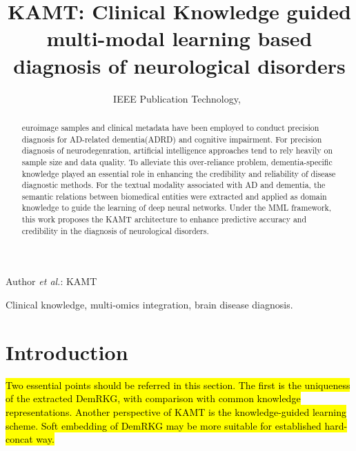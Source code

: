 \documentclass[lettersize,journal]{IEEEtran}
\begin{document}
\title{KAMT: Clinical Knowledge guided multi-modal learning based diagnosis of neurological disorders}


\author{IEEE Publication Technology,~
        
}

%
{Author \MakeLowercase{\textit{et al.}}: KAMT}



\maketitle

\begin{abstract}
        euroimage samples and clinical metadata have been employed to conduct precision diagnosis for AD-related dementia(ADRD) and cognitive impairment.
        For precision diagnosis of neurodegenration, artificial intelligence approaches tend to rely heavily on sample size and data quality.
        To alleviate this over-reliance problem, dementia-specific knowledge played an essential role in enhancing the credibility and reliability of disease diagnostic methods. For the textual modality associated with AD and dementia, the semantic relations between biomedical entities were extracted and applied as domain knowledge to guide the learning of deep neural networks. Under the MML framework, this work proposes the KAMT architecture to enhance predictive accuracy and credibility in the diagnosis of neurological disorders.   
        
\end{abstract}

\begin{IEEEkeywords}
	Clinical knowledge, multi-omics integration, brain disease diagnosis.
\end{IEEEkeywords}

\section{Introduction}
\label{sec:introduction}

    \hl{Two essential points should be referred in this section. The first is the uniqueness of the extracted DemRKG, with comparison with common knowledge representations. Another perspective of KAMT is the knowledge-guided learning scheme. Soft embedding of DemRKG may be more suitable for established hard-concat way.}
    
\end{document}
